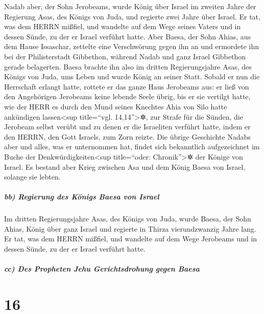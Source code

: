 Nadab aber, der Sohn Jerobeams, wurde König über Israel
im zweiten Jahre der Regierung Asas, des Königs von Juda, und regierte
zwei Jahre über Israel. Er tat, was dem HERRN mißfiel,
und wandelte auf dem Wege seines Vaters und in dessen Sünde, zu der er
Israel verführt hatte. Aber Baesa, der Sohn Ahias, aus
dem Hause Issaschar, zettelte eine Verschwörung gegen ihn an und
ermordete ihn bei der Philisterstadt Gibbethon, während Nadab und ganz
Israel Gibbethon gerade belagerten. Baesa brachte ihn
also im dritten Regierungsjahre Asas, des Königs von Juda, ums Leben und
wurde König an seiner Statt. Sobald er nun die Herrschaft
erlangt hatte, rottete er das ganze Haus Jerobeams aus: er ließ von den
Angehörigen Jerobeams keine lebende Seele übrig, bis er sie vertilgt
hatte, wie der HERR es durch den Mund seines Knechtes Ahia von Silo
hatte ankündigen lassen\textless sup title=``vgl. 14,14''\textgreater✲,
zur Strafe für die Sünden, die Jerobeam selbst verübt und
zu denen er die Israeliten verführt hatte, indem er den HERRN, den Gott
Israels, zum Zorn reizte. Die übrige Geschichte Nadabs
aber und alles, was er unternommen hat, findet sich bekanntlich
aufgezeichnet im Buche der Denkwürdigkeiten\textless sup title=``oder:
Chronik''\textgreater✲ der Könige von Israel. Es bestand
aber Krieg zwischen Asa und dem König Baesa von Israel, solange sie
lebten.

\hypertarget{bb-regierung-des-kuxf6nigs-baesa-von-israel}{%
\subparagraph{bb) Regierung des Königs Baesa von
Israel}\label{bb-regierung-des-kuxf6nigs-baesa-von-israel}}

Im dritten Regierungsjahre Asas, des Königs von Juda,
wurde Baesa, der Sohn Ahias, König über ganz Israel und regierte in
Thirza vierundzwanzig Jahre lang. Er tat, was dem HERRN
mißfiel, und wandelte auf dem Wege Jerobeams und in dessen Sünde, zu der
er Israel verführt hatte.

\hypertarget{cc-des-propheten-jehu-gerichtsdrohung-gegen-baesa}{%
\subparagraph{cc) Des Propheten Jehu Gerichtsdrohung gegen
Baesa}\label{cc-des-propheten-jehu-gerichtsdrohung-gegen-baesa}}

\hypertarget{section-15}{%
\section{16}\label{section-15}}

